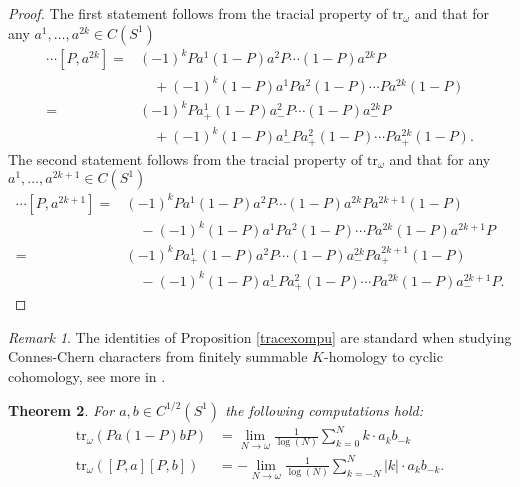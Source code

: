\documentclass[10pt]{amsart}
\newtheorem{thm}{Theorem}[section]
\theoremstyle{remark}
\newtheorem{remark}[thm]{Remark}
\theoremstyle{definition}
\begin{document}
\begin{proof}
The first statement follows from the tracial property of ${\mathrm{t}\mathrm{r}}_\omega$ and that for any $a^1,\ldots, a^{2k}\in C(S^1)$
\begin{align*}
[P,a^1]\cdots [P,a^{2k}]=&(-1)^kPa^1(1-P)a^2P\cdots (1-P)a^{2k}P\\
&\quad+(-1)^k(1-P)a^1Pa^2(1-P)\cdots Pa^{2k}(1-P)\\
=&(-1)^kPa_+^1(1-P)a_-^2P\cdots (1-P)a_-^{2k}P\\
&\quad+(-1)^k(1-P)a_-^1Pa_+^2(1-P)\cdots Pa^{2k}_+(1-P).
\end{align*}
The second statement follows from the tracial property of ${\mathrm{t}\mathrm{r}}_\omega$ and that for any $a^1,\ldots, a^{2k+1}\in C(S^1)$
\begin{align*}
[P,a^1]\cdots [P,a^{2k+1}]=&(-1)^kPa^1(1-P)a^2P\cdots (1-P)a^{2k}Pa^{2k+1}(1-P)\\
&\quad-(-1)^k(1-P)a^1Pa^2(1-P)\cdots Pa^{2k}(1-P)a^{2k+1}P\\
=&(-1)^kPa_+^1(1-P)a^2P\cdots (1-P)a_-^{2k}Pa_+^{2k+1}(1-P)\\
&\quad-(-1)^k(1-P)a_-^1Pa_+^2(1-P)\cdots Pa^{2k}(1-P)a_-^{2k+1}P.
\end{align*}
\end{proof}

\begin{remark}
The identities of Proposition \ref{tracexompu} are standard when studying Connes-Chern characters from finitely summable $K$-homology to cyclic cohomology, see more in \cite[Chapter III]{c}.
\end{remark}

\begin{thm}
\label{computindixprod}
For $a,b\in C^{1/2}(S^1)$ the following computations hold:
\begin{align}
\label{hankelcommprod}
{\mathrm{t}\mathrm{r}}_\omega(Pa(1-P)bP)&=\lim_{N\to \omega} \frac{1}{\log(N)}\sum_{k=0}^Nk\cdot  a_k b_{-k}\\
\label{commprod}
{\mathrm{t}\mathrm{r}}_\omega([P,a][P,b])&=-\lim_{N\to \omega} \frac{1}{\log(N)}\sum_{k=-N}^N|k|\cdot a_k b_{-k}.
\end{align}
\end{thm}
\end{document}
